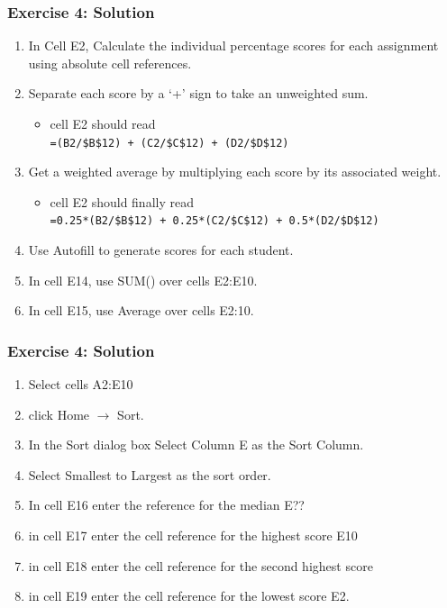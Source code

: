 \documentclass[12pt]{beamer}
\begin{document}
	\begin{frame}
		\frametitle{Exercise 4: Solution}
		\begin{enumerate}
			\item In Cell E2, Calculate the individual percentage scores for each assignment using absolute cell references.
			\item Separate each score by a `+' sign to take an unweighted sum.
				\begin{itemize}
					\item cell E2 should read\\ \texttt{=(B2/\$B\$12) + (C2/\$C\$12) + (D2/\$D\$12)}
				\end{itemize}
			\item Get a weighted average by multiplying each score by its associated weight. 
				\begin{itemize}
					\item cell E2 should finally read\\ \texttt{=0.25*(B2/\$B\$12) + 0.25*(C2/\$C\$12) + 0.5*(D2/\$D\$12)}
				\end{itemize}
				\item Use Autofill to generate scores for each student.
				\item In cell E14, use SUM() over cells E2:E10. 
				\item In cell E15, use Average over cells E2:10.
		\end{enumerate}
	\end{frame}
	\begin{frame}
		\frametitle{Exercise 4: Solution}
		\begin{enumerate} \item Select cells A2:E10
			\item click Home $\rightarrow$ Sort.
			\item In the Sort dialog box Select Column E as the Sort Column. 
			\item Select Smallest to Largest as the sort order.
			\item In cell E16 enter the reference for the median E??
			\item in cell E17 enter the cell reference for the highest score E10
			\item in cell E18 enter the cell reference for the second highest score 
			\item in cell E19 enter the cell reference for the lowest score E2.
		\end{enumerate}
	\end{frame}
\end{document}
